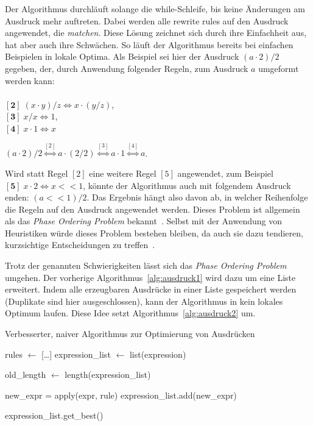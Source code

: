 Der Algorithmus durchläuft solange die while-Schleife, bis keine Änderungen am Ausdruck mehr auftreten.
Dabei werden alle rewrite rules auf den Ausdruck angewendet, die \textit{matchen}.
Diese Lösung zeichnet sich durch ihre Einfachheit aus, hat aber auch ihre Schwächen. So läuft der Algorithmus
bereits bei einfachen Beispielen in lokale Optima.
Als Beispiel sei hier der Ausdruck $(a \cdot 2) / 2$ gegeben, der, durch Anwendung folgender Regeln, zum Ausdruck $a$ umgeformt werden kann: \\ \\
$[\mathbf{2}]\; (x \cdot y) / z \Leftrightarrow x \cdot (y / z)$, \\
$[\mathbf{3}]\; x / x \Leftrightarrow 1$, \\
$[\mathbf{4}]\; x \cdot 1 \Leftrightarrow x$ 

$(a \cdot 2) / 2 \overset{[2]}{\Leftrightarrow} a \cdot (2 / 2) \overset{[3]}{\Leftrightarrow} a \cdot 1 \overset{[4]}{\Leftrightarrow} a$.

Wird statt Regel $[2]$ eine weitere Regel $[5]$ angewendet, zum Beispiel $[\mathbf{5}]\; x \cdot 2 \Leftrightarrow x << 1$, könnte der Algorithmus auch mit folgendem Ausdruck enden: $(a << 1) / 2$.
Das Ergebnis hängt also davon ab, in welcher Reihenfolge die Regeln auf den Ausdruck angewendet werden. 
Dieses Problem ist allgemein als das \textit{Phase Ordering Problem} bekannt~\cite{phaseorder-2009}.
Selbst mit der Anwendung von Heuristiken würde dieses Problem bestehen bleiben, da auch sie dazu tendieren, kurzsichtige Entscheidungen zu treffen~\cite{phaseorder-2009}.

\noindent Trotz der genannten Schwierigkeiten lässt sich das \textit{Phase Ordering Problem} umgehen. Der vorherige Algorithmus~\ref{alg:ausdruck1} wird dazu um eine Liste erweitert.
Indem alle erzeugbaren Ausdrücke in einer Liste gespeichert werden (Duplikate sind hier ausgeschlossen), kann der Algorithmus in kein lokales Optimum laufen.
Diese Idee setzt Algorithmus~\ref{alg:ausdruck2} um.

\begin{algorithm}[H]
  \caption{Verbesserter, naiver Algorithmus zur Optimierung von Ausdrücken}\label{alg:ausdruck2}
  \begin{algorithmic}
    \State rules $\gets$ [\ldots]
    \State expression\_list $\gets$ list(expression)
    
      \State old\_length $\gets$ length(expression\_list)

          \State new\_expr = apply(expr, rule)
          \State expression\_list.add(new\_expr)
          \EndIf
        \EndFor
      \EndFor
    \EndWhile

    \State \Return expression\_list.get\_best()
    \EndFunction
  \end{algorithmic}
\end{algorithm}


